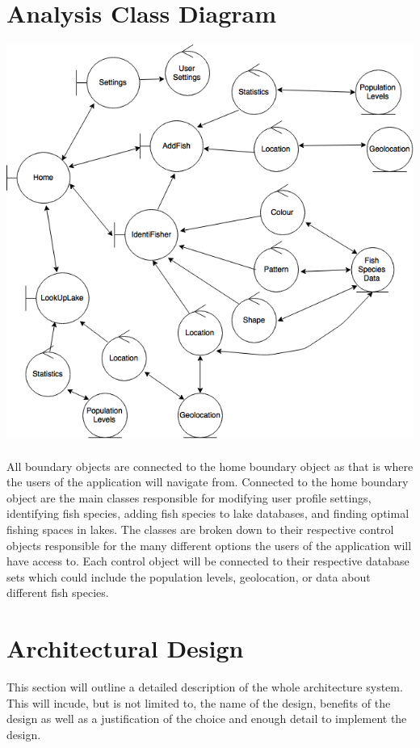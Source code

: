 \documentclass[]{article}
\begin{document}
\section{Analysis Class Diagram}
\label{sec:analysis_class_diagram}
\includegraphics[width=\textwidth]{classAnalysis}
\\ \\
All boundary objects are connected to the home boundary object as that is where the users of the application will navigate from. Connected to the home boundary object are the main classes responsible for modifying user profile settings, identifying fish species, adding fish species to lake databases, and finding optimal fishing spaces in lakes. The classes are broken down to their respective control objects responsible for the many different options the users of the application will have access to. Each control object will be connected to their respective database sets which could include the population levels, geolocation, or data about different fish species.

\section{Architectural Design}
\label{sec:architectural_design}
This section will outline a detailed description of the whole architecture system. This will incude, but is not limited to, the name of the design, benefits of the design as well as a justification of the choice and enough detail to implement the design.
\end{document}
